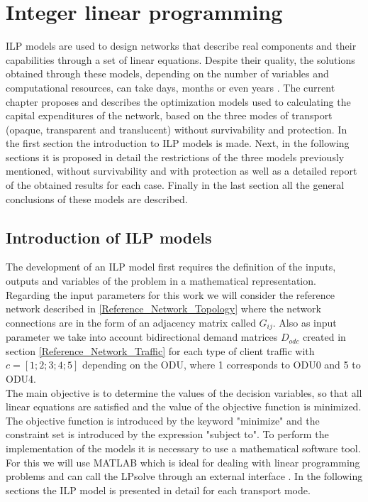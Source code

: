 
\chapter{Integer linear programming}
\label{chap_ilp}
ILP models are used to design networks that describe real components and their capabilities through a set of linear equations. Despite their quality, the solutions obtained through these models, depending on the number of variables and computational resources, can take days, months or even years \cite{ILP01}.
The current chapter proposes and describes the optimization models used to calculating the capital expenditures of the network, based on the three modes of transport (opaque, transparent and translucent) without survivability and protection.
In the first section the introduction to ILP models is made.
Next, in the following sections it is proposed in detail the restrictions of the three models previously mentioned, without survivability and with protection as well as a detailed report of the obtained results for each case.
Finally in the last section all the general conclusions of these models are described.

\newpage
\section{Introduction of ILP models}

The development of an ILP model first requires the definition of the inputs, outputs and variables of the problem in a mathematical representation.
Regarding the input parameters for this work we will consider the reference network described in \ref{Reference_Network_Topology} where the network connections are in the form of an adjacency matrix called $G_{ij}$.
Also as input parameter we take into account bidirectional demand matrices $D_{odc}$ created in section \ref{Reference_Network_Traffic} for each type of client traffic with $c = [1;2;3;4;5]$ depending on the ODU, where 1 corresponds to ODU0 and 5 to ODU4.\\

The main objective is to determine the values of the decision variables, so that all linear equations are satisfied and the value of the objective function is minimized. The objective function is introduced by the keyword "minimize" and the constraint set is introduced by the expression "subject to".
To perform the implementation of the models it is necessary to use a mathematical software tool. For this we will use MATLAB which is ideal for dealing with linear programming problems and can call the LPsolve through an external interface \cite{tesevasco,opaqueILP}. In the following sections the ILP model is presented in detail for each transport mode.\\

